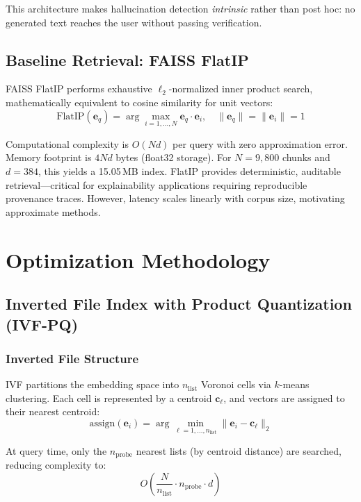 \documentclass[conference]{IEEEtran}
\begin{document}
This architecture makes hallucination detection \emph{intrinsic} rather than post hoc: no generated text reaches the user without passing verification.

\subsection{Baseline Retrieval: FAISS FlatIP}

FAISS FlatIP performs exhaustive $\ell_2$-normalized inner product search, mathematically equivalent to cosine similarity for unit vectors:
\begin{equation}
\mathrm{FlatIP}(\mathbf{e}_q) = \arg\max_{i=1,\ldots,N} \mathbf{e}_q \cdot \mathbf{e}_i, \quad \|\mathbf{e}_q\| = \|\mathbf{e}_i\| = 1
\label{eq:flatip}
\end{equation}

Computational complexity is $O(Nd)$ per query with zero approximation error. Memory footprint is $4Nd$ bytes (float32 storage). For $N{=}9{,}800$ chunks and $d{=}384$, this yields a 15.05\,MB index. FlatIP provides deterministic, auditable retrieval—critical for explainability applications requiring reproducible provenance traces. However, latency scales linearly with corpus size, motivating approximate methods.

\section{Optimization Methodology}

\subsection{Inverted File Index with Product Quantization (IVF-PQ)}

\subsubsection{Inverted File Structure}
IVF partitions the embedding space into $n_{\mathrm{list}}$ Voronoi cells via $k$-means clustering. Each cell is represented by a centroid $\mathbf{c}_\ell$, and vectors are assigned to their nearest centroid:
\begin{equation}
\mathrm{assign}(\mathbf{e}_i) = \arg\min_{\ell=1,\ldots,n_{\mathrm{list}}} \|\mathbf{e}_i - \mathbf{c}_\ell\|_2
\label{eq:ivf_assign}
\end{equation}

At query time, only the $n_{\mathrm{probe}}$ nearest lists (by centroid distance) are searched, reducing complexity to:
\begin{equation}
O\left(\frac{N}{n_{\mathrm{list}}} \cdot n_{\mathrm{probe}} \cdot d\right)
\label{eq:ivf_complexity}
\end{equation}
\end{document}
